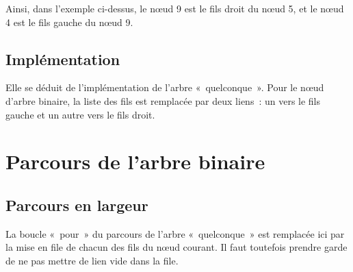 		Ainsi, dans l'exemple ci-dessus, le n{\oe}ud 9 est le fils 
		droit du n{\oe}ud 5, et le n{\oe}ud 4 est le fils gauche du
		n{\oe}ud 9.

	\subsection{Implémentation}
		
		Elle se déduit de l'implémentation de l'arbre «~quelconque~». 
		Pour le n{\oe}ud d'arbre binaire, la liste des fils est
		remplacée par deux liens~: un vers le fils gauche et un autre 
		vers le fils droit.

		


\section{Parcours de l'arbre binaire}

	\subsection{Parcours en largeur}

		La boucle «~pour~» du parcours de l'arbre «~quelconque~» 
		est remplacée ici par la mise en file de chacun des fils du
		n{\oe}ud courant. Il faut toutefois prendre garde de ne 
		pas mettre de lien vide dans la file.
		
